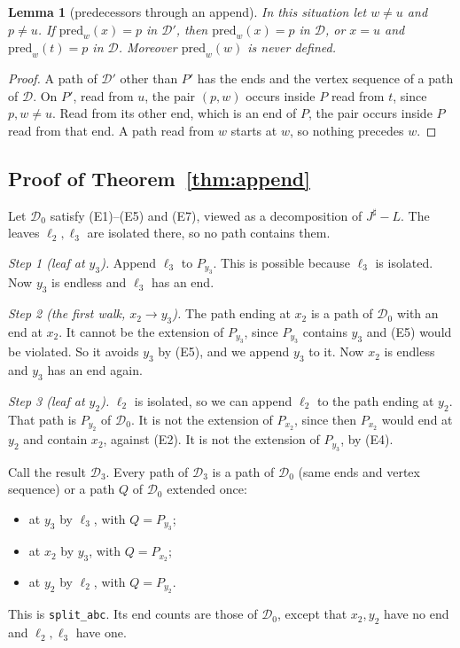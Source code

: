 \documentclass[11pt]{amsart}
\newtheorem{lemma}[theorem]{Lemma}
\theoremstyle{definition}
\newcommand{\cD}{\mathcal D}
\newcommand{\lean}[1]{\quad{\footnotesize[Lean: \texttt{#1}]}}
\newcommand{\sh}{{\sharp}}
\begin{document}
\begin{lemma}[predecessors through an append]\label{lem:transport}
In this situation let $w\ne u$ and $p\ne u$. If $\mathrm{pred}_w(x)=p$ in $\cD'$, then
$\mathrm{pred}_w(x)=p$ in $\cD$, or $x=u$ and $\mathrm{pred}_w(t)=p$ in $\cD$. Moreover
$\mathrm{pred}_w(w)$ is never defined.\lean{fanPred\_append, fanPred\_self}
\end{lemma}

\begin{proof}
A path of $\cD'$ other than $P'$ has the ends and the vertex sequence of a path of $\cD$. On
$P'$, read from $u$, the pair $(p,w)$ occurs inside $P$ read from $t$, since $p,w\ne u$. Read
from its other end, which is an end of $P$, the pair occurs inside $P$ read from that end. A path
read from $w$ starts at $w$, so nothing precedes $w$.
\end{proof}

\subsection*{Proof of Theorem~\ref{thm:append}}
Let $\cD_0$ satisfy (E1)--(E5) and (E7), viewed as a decomposition of $J^\sh-L$. The leaves
$\ell_2,\ell_3$ are isolated there, so no path contains them.

\emph{Step 1 (leaf at $y_3$).} Append $\ell_3$ to $P_{y_3}$. This is possible because $\ell_3$
is isolated. Now $y_3$ is endless and $\ell_3$ has an end.

\emph{Step 2 (the first walk, $x_2\to y_3$).} The path ending at $x_2$ is a path of $\cD_0$ with
an end at $x_2$. It cannot be the extension of $P_{y_3}$, since $P_{y_3}$ contains $y_3$ and
(E5) would be violated. So it avoids $y_3$ by (E5), and we append $y_3$ to it. Now $x_2$ is
endless and $y_3$ has an end again.

\emph{Step 3 (leaf at $y_2$).} $\ell_2$ is isolated, so we can append $\ell_2$ to the path ending
at $y_2$. That path is $P_{y_2}$ of $\cD_0$. It is not the extension of $P_{x_2}$, since then
$P_{x_2}$ would end at $y_2$ and contain $x_2$, against (E2). It is not the extension of
$P_{y_3}$, by (E4).

Call the result $\cD_3$. Every path of $\cD_3$ is a path of $\cD_0$ (same ends and vertex
sequence) or a path $Q$ of $\cD_0$ extended once:
\begin{itemize}
\item at $y_3$ by $\ell_3$, with $Q=P_{y_3}$;
\item at $x_2$ by $y_3$, with $Q=P_{x_2}$;
\item at $y_2$ by $\ell_2$, with $Q=P_{y_2}$.
\end{itemize}
This is \texttt{split\_abc}. Its end counts are those of $\cD_0$, except that
$x_2,y_2$ have no end and $\ell_2,\ell_3$ have one.
\end{document}
